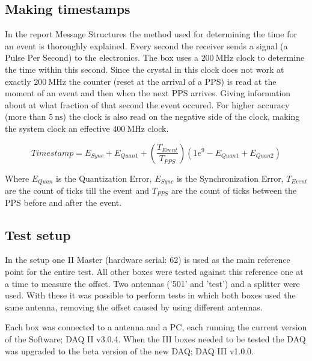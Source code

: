 \subsection{Making timestamps}
\label{sub:gps_timestamps}

In the report Message Structures \hisparc the method used for
determining the time for an event is thoroughly explained. Every second
the \gps receiver sends a signal (a Pulse Per Second) to the \hisparc
electronics. The \hisparc box uses a $\SI{200}{\mega\hertz}$ clock to
determine the time within this second. Since the crystal in this clock
does not work at exactly $\SI{200}{\mega\hertz}$ the counter (reset at
the arrival of a PPS) is read at the moment of an event and then when
the next PPS arrives. Giving information about at what fraction of that
second the event occured. For higher accuracy (more than
$\SI{5}{\nano\second}$) the clock is also read on the negative side of
the clock, making the system clock an effective
$\SI{400}{\mega\hertz}$ clock.

\begin{equation}
    Timestamp = E_{Sync} + E_{Quan1} + \left(\frac{T_{Event}}{T_{PPS}}\right)
                 \left(1e^9 - E_{Quan1} + E_{Quan2}\right)
\end{equation}

Where $E_{Quan}$ is the Quantization Error, $E_{Sync}$ is the
Synchronization Error, $T_{Event}$ are the count of ticks till the event
and $T_{PPS}$ are the count of ticks between the PPS before and after
the event.



\subsection{Test setup}
\label{sub:gps_test_setup}

In the setup one \hisparc II Master (hardware serial: 62) is used as the
main reference point for the entire test. All other \hisparc boxes were
tested against this reference one at a time to measure the offset. Two
\gps antennas ('501' and 'test') and a \gps splitter were used. With
these it was possible to perform tests in which both \hisparc boxes used
the same \gps antenna, removing the offset caused by using different
\gps antennas.

Each \hisparc box was connected to a \gps antenna and a PC, each running
the current version of the \hisparc Software; \hisparc DAQ II v3.0.4.
When the \hisparc III boxes needed to be tested the DAQ was upgraded to
the beta version of the new DAQ; \hisparc DAQ III v1.0.0.

